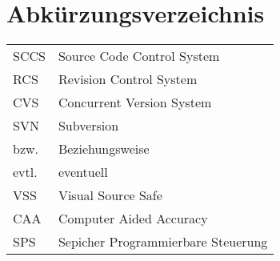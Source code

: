 \chapter*{Abkürzungsverzeichnis}
\begin{tabular}{ll}
SCCS & Source Code Control System \\ 
RCS & Revision Control System \\ 
CVS & Concurrent Version System \\
SVN & Subversion \\
bzw. & Beziehungsweise \\
evtl. & eventuell \\ 
VSS & Visual Source Safe \\
CAA & Computer Aided Accuracy \\
SPS & Sepicher Programmierbare Steuerung \\
\end{tabular} 